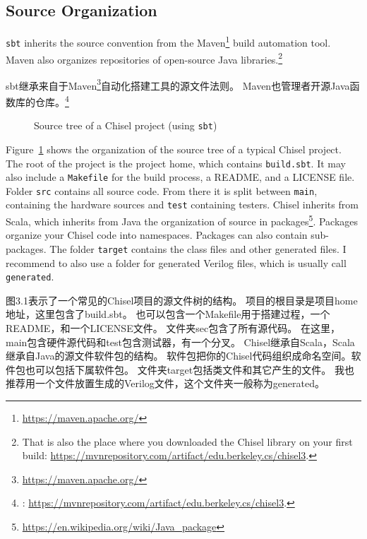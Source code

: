 \documentclass[%
    10pt,
    headinclude, footexclude,
    openright, %
    notitlepage,
    cleardoubleempty,
    headsepline,
    pointlessnumbers,
    bibtotoc, idxtotoc,
    ]{scrbook}
\newcommand{\code}[1]{{\small{\texttt{#1}}}}
\newcommand{\myref}[2]{\href{#1}{#2}}
\renewcommand{\myref}[2]{{#2}{\footnote{\url{#1}}}}
\begin{document}
\subsection{Source Organization}

\code{sbt} inherits the source convention from the \myref{https://maven.apache.org/}{Maven}
build automation tool. Maven also organizes repositories of open-source Java libraries.\footnote{That is
also the place where you downloaded the Chisel library on your first build:
\url{https://mvnrepository.com/artifact/edu.berkeley.cs/chisel3}.}

sbt继承来自于\myref{https://maven.apache.org/}{Maven}自动化搭建工具的源文件法则。
Maven也管理者开源Java函数库的仓库。\footnote{:
\url{https://mvnrepository.com/artifact/edu.berkeley.cs/chisel3}.}

\begin{figure}
\caption{Source tree of a Chisel project (using \code{sbt})}
\label{fig:folders}
\end{figure}

Figure~\ref{fig:folders} shows the organization of the source tree of a typical Chisel project.
The root of the project is the project home, which contains \code{build.sbt}.
It may also include a \code{Makefile} for the build process, a README, and a LICENSE file.
Folder \code{src} contains all source code. From there it is split between \code{main},
containing the hardware sources and \code{test} containing testers.
Chisel inherits from Scala, which inherits from Java the organization of source
in \myref{https://en.wikipedia.org/wiki/Java_package}{packages}.
Packages organize your Chisel code into namespaces. Packages can also contain
sub-packages.
The folder \code{target} contains the class files and other generated files.
I recommend to also use a folder for generated Verilog files, which is usually
call \code{generated}.

图3.1表示了一个常见的Chisel项目的源文件树的结构。
项目的根目录是项目home地址，这里包含了build.sbt。
也可以包含一个Makefile用于搭建过程，一个README，和一个LICENSE文件。
文件夹sec包含了所有源代码。
在这里，main包含硬件源代码和test包含测试器，有一个分叉。
Chisel继承自Scala，Scala继承自Java的源文件软件包的结构。
软件包把你的Chisel代码组织成命名空间。软件包也可以包括下属软件包。
文件夹target包括类文件和其它产生的文件。
我也推荐用一个文件放置生成的Verilog文件，这个文件夹一般称为generated。
\end{document}
